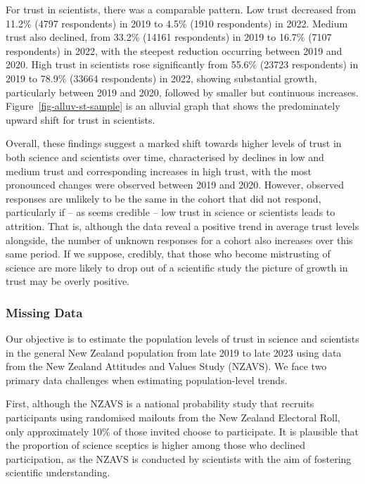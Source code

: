 \documentclass[
  single column]{article}
\begin{document}
For trust in scientists, there was a comparable pattern. Low trust
decreased from 11.2\% (4797 respondents) in 2019 to 4.5\% (1910
respondents) in 2022. Medium trust also declined, from 33.2\% (14161
respondents) in 2019 to 16.7\% (7107 respondents) in 2022, with the
steepest reduction occurring between 2019 and 2020. High trust in
scientists rose significantly from 55.6\% (23723 respondents) in 2019 to
78.9\% (33664 respondents) in 2022, showing substantial growth,
particularly between 2019 and 2020, followed by smaller but continuous
increases. Figure~\ref{fig-alluv-st-sample} is an alluvial graph that
shows the predominately upward shift for trust in scientists.

Overall, these findings suggest a marked shift towards higher levels of
trust in both science and scientists over time, characterised by
declines in low and medium trust and corresponding increases in high
trust, with the most pronounced changes were observed between 2019 and
2020. However, observed responses are unlikely to be the same in the
cohort that did not respond, particularly if -- as seems credible -- low
trust in science or scientists leads to attrition. That is, although the
data reveal a positive trend in average trust levels alongside, the
number of unknown responses for a cohort also increases over this same
period. If we suppose, credibly, that those who become mistrusting of
science are more likely to drop out of a scientific study the picture of
growth in trust may be overly positive.

\subsubsection{Missing Data}\label{missing-data}

Our objective is to estimate the population levels of trust in science
and scientists in the general New Zealand population from late 2019 to
late 2023 using data from the New Zealand Attitudes and Values Study
(NZAVS). We face two primary data challenges when estimating
population-level trends.

First, although the NZAVS is a national probability study that recruits
participants using randomised mailouts from the New Zealand Electoral
Roll, only approximately 10\% of those invited choose to participate. It
is plausible that the proportion of science sceptics is higher among
those who declined participation, as the NZAVS is conducted by
scientists with the aim of fostering scientific understanding.
\end{document}
